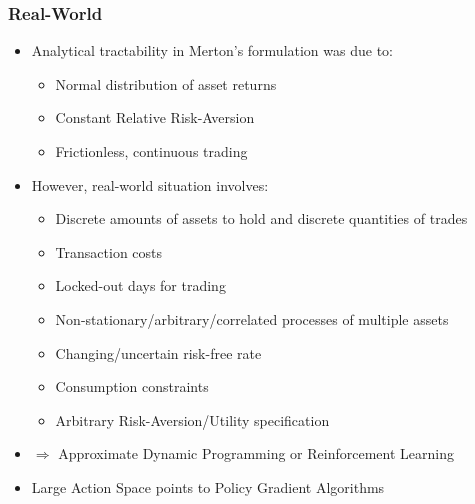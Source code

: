 \documentclass[handout]{beamer}
\begin{document}
\begin{frame}
\frametitle{Real-World}
\pause
\begin{itemize}[<+->]
\item Analytical tractability in Merton's formulation was due to:
\begin{itemize}
\item Normal distribution of asset returns
\item Constant Relative Risk-Aversion
\item Frictionless, continuous trading
\end{itemize}
\item However, real-world situation involves:
\begin{itemize}
\item Discrete amounts of assets to hold and discrete quantities of trades
\item Transaction costs
\item Locked-out days for trading
\item Non-stationary/arbitrary/correlated processes of multiple assets
\item Changing/uncertain risk-free rate
\item Consumption constraints
\item Arbitrary Risk-Aversion/Utility specification
\end{itemize}
\item $\Rightarrow$ Approximate Dynamic Programming or Reinforcement Learning
\item Large Action Space points to Policy Gradient Algorithms
\end{itemize}
\end{frame}
\end{document}
